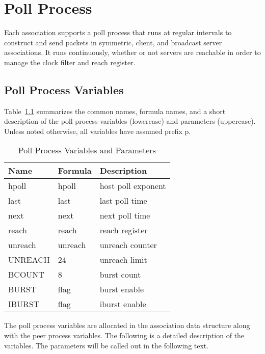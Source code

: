\chapter{Poll Process}
\label{section-13}

Each association supports a poll process that runs at regular
intervals to construct and send packets in symmetric, client, and
broadcast server associations. It runs continuously, whether or not
servers are reachable in order to manage the clock filter and reach
register.

\section{Poll Process Variables}
\label{section-13-1}

Table~\ref{poll_process_variables_and_parameters} summarizes the common names, formula names, and a short
description of the poll process variables (lowercase) and parameters
(uppercase). Unless noted otherwise, all variables have assumed
prefix p.

\begin{table}[htb]
\center
\begin{tabular}{| l | l | l |}
\hline
Name    & Formula & Description        \\
\hline
\hline
hpoll   & hpoll   & host poll exponent \\
last    & last    & last poll time     \\
next    & next    & next poll time     \\
reach   & reach   & reach register     \\
unreach & unreach & unreach counter    \\
UNREACH & 24      & unreach limit      \\
BCOUNT  & 8       & burst count        \\
BURST   & flag    & burst enable       \\
IBURST  & flag    & iburst enable      \\
\hline
\end{tabular}
\caption{Poll Process Variables and Parameters}
\label{poll_process_variables_and_parameters}
\end{table}

The poll process variables are allocated in the association data
structure along with the peer process variables. The following is a
detailed description of the variables. The parameters will be called
out in the following text.

